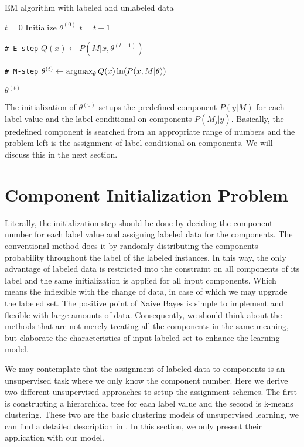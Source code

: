 \begin{algorithm}[H]
	\caption{EM algorithm with labeled and unlabeled data}
	\begin{algorithmic}[1]
		\State $t = 0$
		\State Initialize $\theta^{(0)}$
		\Repeat
		\State $t = t + 1$
		
		\State \texttt{\# E-step}
		\State $Q(x) \gets P(M | x, \theta^{(t-1)})$ 
						
		\State \texttt{\# M-step}
		\State $\theta^{(t)} \gets \operatorname{argmax}_{\theta} 
		{Q(x) \ln(P(x, M | \theta))}$ 
		
		
		\State \Return $\theta^{(t)}$
		\EndFunction
	\end{algorithmic}
	\label{alg2: EM algorithm}
\end{algorithm}

The initialization of $\theta^{(0)}$ setups the predefined component $P(y|M)$ for each label value and the label conditional on components $P(M_j|y)$. Basically, the predefined component is searched from an appropriate range of numbers and the problem left is the assignment of label conditional on components. We will discuss this in the next section.

\section{Component Initialization Problem}
Literally, the initialization step should be done by deciding the component number for each label value and assigning labeled data for the components. The conventional method does it by randomly distributing the components probability throughout the label of the labeled instances. In this way, the only advantage of labeled data is restricted into the constraint on all components of its label and the same initialization is applied for all input components. Which means the inflexible with the change of data, in case of which we may upgrade the labeled set. The positive point of Naive Bayes is simple to implement and flexible with large amounts of data. Consequently, we should think about the methods that are not merely treating all the components in the same meaning, but elaborate the characteristics of input labeled set to enhance the learning model.

We may contemplate that the assignment of labeled data to components is an unsupervised task where we only know the component number. Here we derive two different unsupervised approaches to setup the assignment schemes. The first is constructing a hierarchical tree for each label value and the second is k-means clustering. These two are the basic clustering models of unsupervised learning, we can find a detailed description in \parencite{Manning:2008:IIR:1394399}. In this section, we only present their application with our model.

